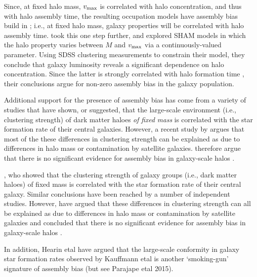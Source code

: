 \documentclass[usenatbib,usegraphicx,letterpaper]{mn2e}
\newcommand{\vmax}{v_{\rm max}}
\begin{document}
Since, at fixed halo mass, $\vmax$ is correlated with halo
concentration, and thus with halo assembly time, the resulting
occupation models have assembly bias build in
\citep[see][]{Zentner_etal14}; i.e., at fixed halo mass, galaxy
properties will be correlated with halo assembly
time. \citet{lehmann_etal15} took this one step further, and explored
SHAM models in which the halo property varies between $M$ and $\vmax$
via a continuously-valued parameter. Using SDSS clustering
measurements to constrain their model, they conclude that galaxy
luminosity reveals a significant dependence on halo
concentration. Since the latter is strongly correlated with halo
formation time \citep[e.g.,][]{wechsler02,zhao_etal09,ludlow_etal13},
their conclusions argue for non-zero assembly bias in the galaxy
population.

Additional support for the presence of assembly bias has come from a
variety of studies that have shown, or suggested, that the large-scale
environment (i.e., clustering strength) of dark matter haloes {\it of
  fixed mass} is correlated with the star formation rate of their
central
galaxies\citep[][]{yang_etal06a,blanton_berlind07,wang_etal08,tinker_etal12,wang_etal13,HW13a,hearin_etal13b,hearin_etal14,watson_etal14}.
However, a recent study by \citet{lin_mandelbaum_etal15} argues that
most of the these differences in clustering strength can be explained
as due to differences in halo mass or contamination by satellite
galaxies. \citet{lin_mandelbaum_etal15} therefore argue that there is
no significant evidence for assembly bias in galaxy-scale halos
\citep[see also][]{paranjape15}.

\citet{yang_etal06a}, who showed that the clustering strength of
galaxy groups (i.e., dark matter haloes) of fixed mass is correlated
with the star formation rate of their central galaxy. Similar
conclusions have been reached by a number of independent
studies\citep[][]{blanton_berlind07,wang_etal08,tinker_etal12,wang_etal13,hearin_etal14}. However,
\citet{lin_mandelbaum_etal15} have argued that these differences in
clustering strength can all be explained as due to differences in halo
mass or contamination by satellite galaxies and concluded that there
is no significant evidence for assembly bias in galaxy-scale halos
\citep[see also][]{paranjape15}.

In addition, Hearin etal have argued that the large-scale conformity
in galaxy star formation rates observed by Kauffmann etal is another
`smoking-gun' signature of assembly bias (but see Parajape etal 2015). 
\end{document}

